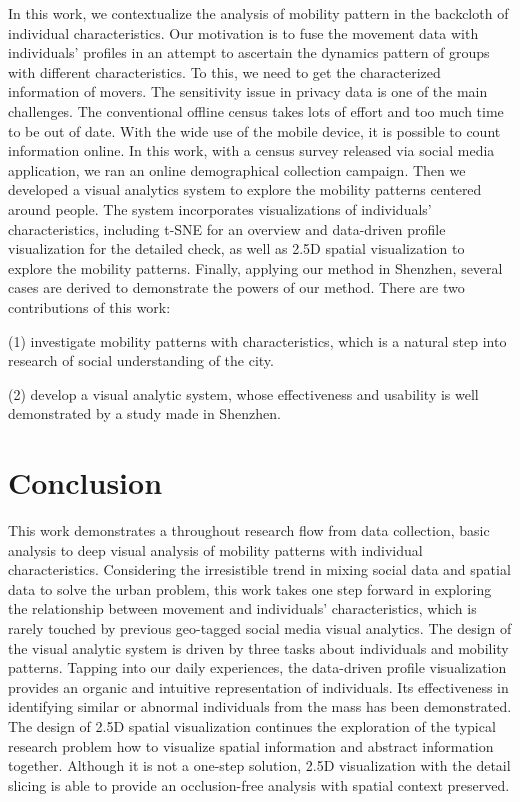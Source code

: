 \documentclass{vgtc}                          %
\begin{document}
In this work, we contextualize the analysis of mobility pattern in the backcloth of individual characteristics. Our motivation is to fuse the movement data with individuals' profiles in an attempt to ascertain the dynamics pattern of groups with different characteristics. To this, we need to get the characterized information of movers. The sensitivity issue in privacy data is one of the main challenges. The conventional offline census takes lots of effort and too much time to be out of date. With the wide use of the mobile device, it is possible to count information online. In this work, with a census survey released via social media application, we ran an online demographical collection campaign. Then we developed a visual analytics system to explore the mobility patterns centered around people. The system incorporates visualizations of individuals' characteristics, including t-SNE for an overview and data-driven profile visualization for the detailed check, as well as 2.5D spatial visualization to explore the mobility patterns. Finally, applying our method in Shenzhen, several cases are derived to demonstrate the powers of our method. There are two contributions of this work: 

(1) investigate mobility patterns with characteristics, which is a natural step into research of social understanding of the city. 

(2) develop a visual analytic system, whose effectiveness and usability is well demonstrated by a study made in Shenzhen.








\section{Conclusion}
\label{sec:conclusion}

This work demonstrates a throughout research flow from data collection, basic analysis to deep visual analysis of mobility patterns with individual characteristics. Considering the irresistible trend in mixing social data and spatial data to solve the urban problem, this work takes one step forward in exploring the relationship between movement and individuals' characteristics, which is rarely touched by previous geo-tagged social media visual analytics. The design of the visual analytic system is driven by three tasks about individuals and mobility patterns. Tapping into our daily experiences, the data-driven profile visualization provides an organic and intuitive representation of individuals. Its effectiveness in identifying similar or abnormal individuals from the mass has been demonstrated. The design of 2.5D spatial visualization continues the exploration of the typical research problem how to visualize spatial information and abstract information together. Although it is not a one-step solution, 2.5D visualization with the detail slicing is able to provide an occlusion-free analysis with spatial context preserved. 
\end{document}
